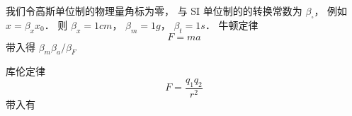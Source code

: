
我们令高斯单位制的物理量角标为零， 与 SI 单位制的的转换常数为 $\beta_\square$， 例如 $x = \beta_x x_0$． 则 $\beta_x = 1cm$， $\beta_m = 1g$， $\beta_t = 1s$．
牛顿定律
\begin{equation}
F = ma
\end{equation}
带入得 $\beta_m \beta_a / \beta_F$

库伦定律
\begin{equation}
F = \frac{q_1 q_2}{r^2}
\end{equation}
带入有
\begin{equation}

\end{equation}

